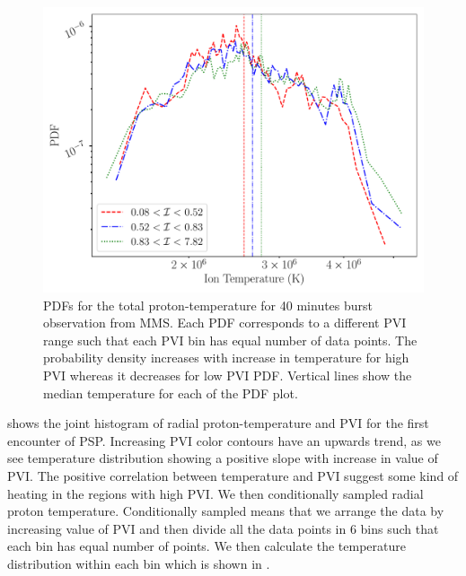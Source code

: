         \begin{figure}
            \begin{center}
                \includegraphics[width=1.\textwidth]{figures/chap6/T_pdf_pvi_mms_20171226_4.pdf}
                \caption[PDF of $T_{\rm \parallel p}$ for various $\mathcal{I}$ for \texttt{mms}
                dataset]{PDFs for the total proton-temperature for 40 minutes burst observation from
                MMS. Each PDF corresponds to a different PVI range such that each PVI bin has equal
                number of data points. The probability density increases with increase in
                temperature for high PVI whereas it decreases for low PVI PDF. Vertical lines show
                the median temperature for each of the PDF plot.}
                \label{fig:pvi_pdf_mms}
            \end{center}
        \end{figure}

         shows the joint histogram of radial proton-temperature and PVI for
        the first encounter of PSP. Increasing PVI color contours have an upwards trend, as we see
        temperature distribution showing a positive slope with increase in value of PVI. The
        positive correlation between temperature and PVI suggest some kind of heating in the regions
        with high PVI. We then conditionally sampled radial proton temperature. Conditionally
        sampled means that we arrange the data by increasing value of PVI and then divide all the
        data points in 6 bins such that each bin has equal number of points. We then calculate the
        temperature distribution within each bin which is shown in .

